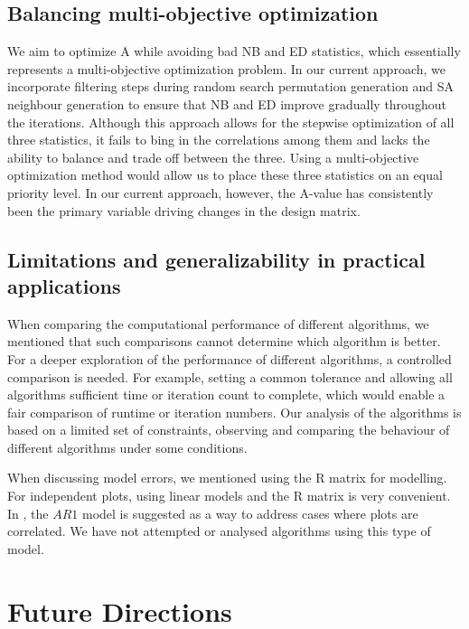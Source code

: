 \documentclass[
  a4paper,
  oneside,
  openany,
  12pt,
  onecolumn]{book}
\theoremstyle{plain}
\theoremstyle{definition}
\theoremstyle{remark}
\begin{document}
\subsection{Balancing multi-objective
optimization}\label{balancing-multi-objective-optimization}

We aim to optimize A while avoiding bad NB and ED statistics, which
essentially represents a multi-objective optimization problem. In our
current approach, we incorporate filtering steps during random search
permutation generation and SA neighbour generation to ensure that NB and
ED improve gradually throughout the iterations. Although this approach
allows for the stepwise optimization of all three statistics, it fails
to bing in the correlations among them and lacks the ability to balance
and trade off between the three. Using a multi-objective optimization
method would allow us to place these three statistics on an equal
priority level. In our current approach, however, the A-value has
consistently been the primary variable driving changes in the design
matrix.

\subsection{Limitations and generalizability in practical
applications}\label{limitations-and-generalizability-in-practical-applications}

When comparing the computational performance of different algorithms, we
mentioned that such comparisons cannot determine which algorithm is
better. For a deeper exploration of the performance of different
algorithms, a controlled comparison is needed. For example, setting a
common tolerance and allowing all algorithms sufficient time or
iteration count to complete, which would enable a fair comparison of
runtime or iteration numbers. Our analysis of the algorithms is based on
a limited set of constraints, observing and comparing the behaviour of
different algorithms under some conditions.

When discussing model errors, we mentioned using the R matrix for
modelling. For independent plots, using linear models and the R matrix
is very convenient. In \citet{piepho2018neighbor}, the \({AR1}\) model
is suggested as a way to address cases where plots are correlated. We
have not attempted or analysed algorithms using this type of model.

\section{Future Directions}\label{future-directions}
\end{document}
